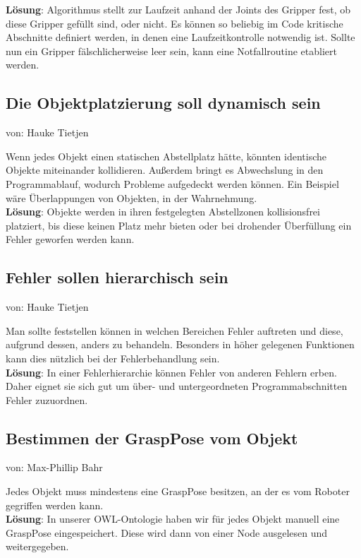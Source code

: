 \documentclass{suturo}
\makeatletter
\newcommand{\chapterauthor}[1]{%
  {\parindent0pt\vspace*{-27pt}%
  \linespread{0}\small\begin{flushright}von: #1\end{flushright}%
  \par\nobreak\vspace*{0pt}}
  \@afterheading%
}
\makeatother
\begin{document}
\textbf{Lösung}: Algorithmus stellt zur Laufzeit anhand der Joints des Gripper fest, ob diese Gripper gefüllt sind, oder nicht. Es können so beliebig im Code kritische Abschnitte definiert werden, in denen eine Laufzeitkontrolle notwendig ist. Sollte nun ein Gripper fälschlicherweise leer sein, kann eine Notfallroutine etabliert werden.

\subsection{Die Objektplatzierung soll dynamisch sein}
\chapterauthor{Hauke Tietjen}
Wenn jedes Objekt einen statischen Abstellplatz hätte, könnten identische Objekte miteinander kollidieren. Außerdem bringt es Abwechslung in den Programmablauf, wodurch Probleme aufgedeckt werden können. Ein Beispiel wäre Überlappungen von Objekten, in der Wahrnehmung. \\

\textbf{Lösung}: Objekte werden in ihren festgelegten Abstellzonen kollisionsfrei platziert, bis diese keinen Platz mehr bieten oder bei drohender Überfüllung ein Fehler geworfen werden kann.


\subsection{Fehler sollen hierarchisch sein}
\chapterauthor{Hauke Tietjen}
Man sollte feststellen können in welchen Bereichen Fehler auftreten und diese, aufgrund dessen, anders zu behandeln. Besonders in höher gelegenen Funktionen kann dies nützlich bei der Fehlerbehandlung sein. \\

\textbf{Lösung}: In einer Fehlerhierarchie können Fehler von anderen Fehlern erben. Daher eignet sie sich gut um über- und untergeordneten Programmabschnitten Fehler zuzuordnen.

\subsection{Bestimmen der GraspPose vom Objekt}
\chapterauthor{Max-Phillip Bahr}
Jedes Objekt muss mindestens eine GraspPose besitzen, an der es vom Roboter gegriffen werden kann.\\

\textbf{Lösung}: In unserer OWL-Ontologie haben wir für jedes Objekt manuell eine GraspPose eingespeichert. Diese wird dann von einer Node ausgelesen und weitergegeben.
\end{document}
